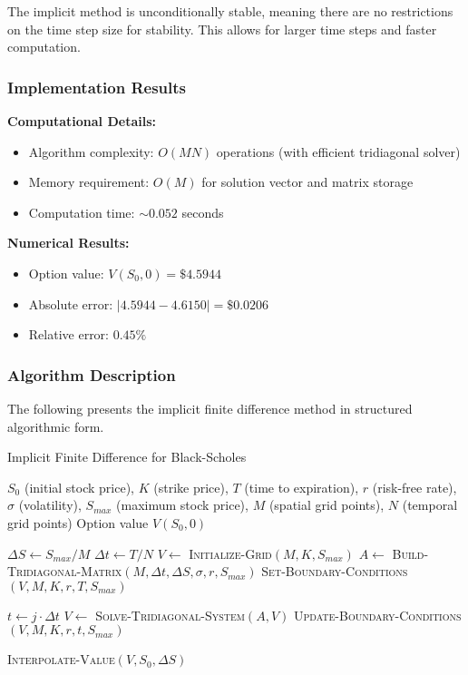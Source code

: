 \documentclass[12pt,a4paper]{article}
\numberwithin{algorithm}{subsection}
\begin{document}
The implicit method is unconditionally stable, meaning there are no restrictions on the time step size for stability. This allows for larger time steps and faster computation.

\subsubsection{Implementation Results}

\textbf{Computational Details:}
\begin{itemize}
\item Algorithm complexity: $O(MN)$ operations (with efficient tridiagonal solver)
\item Memory requirement: $O(M)$ for solution vector and matrix storage
\item Computation time: $\sim 0.052$ seconds
\end{itemize}

\textbf{Numerical Results:}
\begin{itemize}
\item Option value: $V(S_0, 0) = \$4.5944$
\item Absolute error: $|4.5944 - 4.6150| = \$0.0206$
\item Relative error: $0.45\%$
\end{itemize}

\subsubsection{Algorithm Description}

The following presents the implicit finite difference method in structured algorithmic form.

\begin{algorithm}[H]
\caption{Implicit Finite Difference for Black-Scholes}
\begin{algorithmic}[1]
\REQUIRE $S_0$ (initial stock price), $K$ (strike price), $T$ (time to expiration), $r$ (risk-free rate), $\sigma$ (volatility), $S_{max}$ (maximum stock price), $M$ (spatial grid points), $N$ (temporal grid points)
\ENSURE Option value $V(S_0, 0)$

\STATE $\Delta S \leftarrow S_{max} / M$
\STATE $\Delta t \leftarrow T / N$
\STATE $V \leftarrow$ \textsc{Initialize-Grid}$(M, K, S_{max})$
\STATE $A \leftarrow$ \textsc{Build-Tridiagonal-Matrix}$(M, \Delta t, \Delta S, \sigma, r, S_{max})$
\STATE \textsc{Set-Boundary-Conditions}$(V, M, K, r, T, S_{max})$

    \STATE $t \leftarrow j \cdot \Delta t$
    \STATE $V \leftarrow$ \textsc{Solve-Tridiagonal-System}$(A, V)$
    \STATE \textsc{Update-Boundary-Conditions}$(V, M, K, r, t, S_{max})$
\ENDFOR

\RETURN \textsc{Interpolate-Value}$(V, S_0, \Delta S)$
\end{algorithmic}
\end{algorithm}
\end{document}
